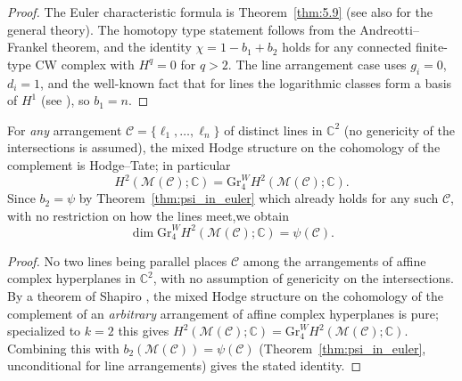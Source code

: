 \documentclass[article,11pt]{amsart} \numberwithin{equation}{section}
\numberwithin{equation}{section}
\begin{document}
{\begin{proof}
	The Euler characteristic formula is Theorem~\ref{thm:5.9} (see also \cite{Dimca1992} for the general theory).
	The homotopy type statement follows from the Andreotti–Frankel theorem, and the identity $\chi = 1 - b_1 + b_2$ holds for any connected finite-type CW complex with $H^q=0$ for $q>2$. The line arrangement case uses $g_i=0$, $d_i=1$, and the well-known fact that for lines the logarithmic classes form a basis of $H^1$ (see \cite{dimca}), so $b_1 = n$.
\end{proof}

\begin{cor}
	\label{cor:line_arrangement_hodge}
	For \emph{any} arrangement $\mathcal C=\{\ell_1,\dots,\ell_n\}$ of distinct
	lines in $\mathbb{C}^2$ (no genericity of the intersections is assumed), the mixed
	Hodge structure on the cohomology of the complement is Hodge--Tate; in
	particular
	\[
	H^2(\mathcal M(\mathcal C);\mathbb{C})=\mathrm{Gr}^W_4H^2(\mathcal M(\mathcal C);\mathbb{C}).
	\]
	Since $b_2=\psi$ by Theorem~\ref{thm:psi_in_euler} which already holds for any such
	$\mathcal C$, with no restriction on how the lines meet,we obtain
	\[
	\dim \mathrm{Gr}^W_4H^2(\mathcal M(\mathcal C);\mathbb{C})=\psi(\mathcal C).
	\]
\end{cor}

\begin{proof}
	No two lines being parallel places $\mathcal C$ among the arrangements of
	affine complex hyperplanes in $\mathbb{C}^2$, with no assumption of genericity on the
	intersections. By a theorem of Shapiro \cite{Shapiro1993}, the mixed Hodge
	structure on the cohomology of the complement of an \emph{arbitrary}
	arrangement of affine complex hyperplanes is pure; specialized to $k=2$ this
	gives $H^2(\mathcal M(\mathcal C);\mathbb{C})=\mathrm{Gr}^W_4H^2(\mathcal M(\mathcal C);\mathbb{C})$. Combining
	this with $b_2(\mathcal M(\mathcal C))=\psi(\mathcal C)$ (Theorem~\ref{thm:psi_in_euler}, unconditional
	for line arrangements) gives the stated identity.
\end{proof}

}
\end{document}
